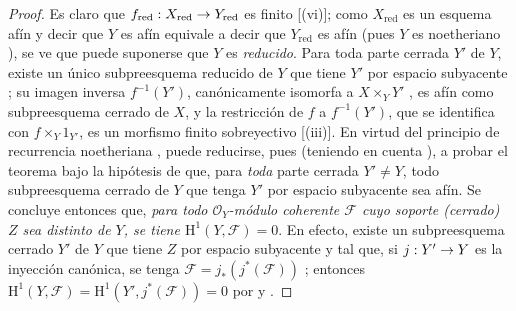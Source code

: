 \documentclass[oneside,10pt]{amsart}
\makeatletter
\newcommand{\ega@arrow}[2]{\mathchoice{#1}{#2}{#2}{#2}}
\renewcommand{\to}{\ega@arrow{\longrightarrow}{\rightarrow}}
\makeatother
\begin{document}
\begin{proof}
Es claro que
$f_{\mathrm{red}}:X_{\mathrm{red}}\to Y_{\mathrm{red}}$
es finito [(vi)];
como $X_{\mathrm{red}}$ es un esquema afín y decir que $Y$ es afín equivale a decir que $Y_{\mathrm{red}}$ es afín (pues $Y$ es noetheriano ), se ve que puede suponerse que $Y$ es \emph{reducido}.
Para toda parte cerrada $Y'$ de $Y$, existe un único subpreesquema reducido de $Y$ que tiene $Y'$ por espacio subyacente ;
su imagen inversa $f^{-1}(Y')$, canónicamente isomorfa a $X\times_Y Y'$ , es afín como subpreesquema cerrado de $X$, y la restricción de $f$ a $f^{-1}(Y')$, que se identifica con $f\times_Y 1_{Y'}$, es un morfismo finito sobreyectivo [(iii)].
En virtud del principio de recurrencia noetheriana , puede reducirse, pues (teniendo en cuenta ), a probar el teorema bajo la hipótesis de que, para \emph{toda} parte cerrada $Y'\neq Y$, todo subpreesquema cerrado de $Y$ que tenga $Y'$ por espacio subyacente sea afín.
Se concluye entonces que, \emph{para todo $\mathcal{O}_Y$-módulo coherente $\mathcal{F}$ cuyo soporte (cerrado) $Z$ sea distinto de $Y$, se tiene $\mathrm{H}^1(Y,\mathcal{F})=0$}.
En efecto, existe un subpreesquema cerrado $Y'$ de $Y$ que tiene $Z$ por espacio subyacente y tal que, si $j:Y'\to Y$ es la inyección canónica, se tenga
$\mathcal{F}=j_*(j^*(\mathcal{F}))$
;
entonces
$\mathrm{H}^1(Y,\mathcal{F})
=\mathrm{H}^1(Y',j^*(\mathcal{F}))=0$
por  y .


\end{proof}
\end{document}
